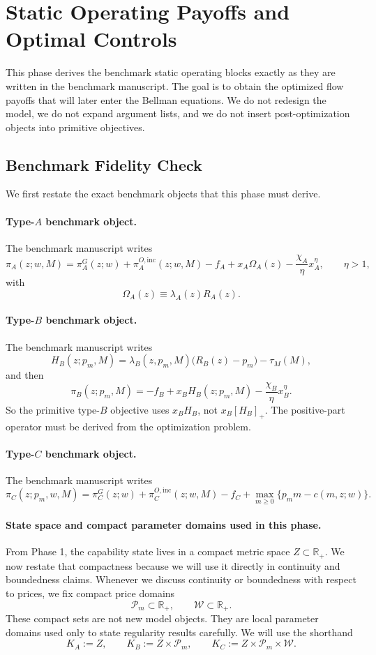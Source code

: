 \section{Static Operating Payoffs and Optimal Controls}

This phase derives the benchmark static operating blocks exactly as they are written in the benchmark manuscript. The goal is to obtain the optimized flow payoffs that will later enter the Bellman equations. We do not redesign the model, we do not expand argument lists, and we do not insert post-optimization objects into primitive objectives.

\subsection{Benchmark Fidelity Check}

We first restate the exact benchmark objects that this phase must derive.

\paragraph{Type-$A$ benchmark object.}
The benchmark manuscript writes
\[
\pi_A(z;w,M)
=
\pi_A^G(z;w)+\pi_A^{O,\mathrm{inc}}(z;w,M)-f_A
+x_A\Omega_A(z)-\frac{\chi_A}{\eta}x_A^\eta,
\qquad \eta>1,
\]
with
\[
\Omega_A(z)\equiv \lambda_A(z)R_A(z).
\]

\paragraph{Type-$B$ benchmark object.}
The benchmark manuscript writes
\[
H_B(z;p_m,M)=\lambda_B(z,p_m,M)\bigl(R_B(z)-p_m\bigr)-\tau_M(M),
\]
and then
\[
\pi_B(z;p_m,M)
=
-f_B+x_BH_B(z;p_m,M)-\frac{\chi_B}{\eta}x_B^\eta.
\]
So the primitive type-$B$ objective uses $x_BH_B$, not $x_B[H_B]_+$. The positive-part operator must be derived from the optimization problem.

\paragraph{Type-$C$ benchmark object.}
The benchmark manuscript writes
\[
\pi_C(z;p_m,w,M)
=
\pi_C^G(z;w)+\pi_C^{O,\mathrm{inc}}(z;w,M)-f_C
+\max_{m\ge 0}\{p_m m-c(m,z;w)\}.
\]

\paragraph{State space and compact parameter domains used in this phase.}
From Phase 1, the capability state lives in a compact metric space $Z\subset \mathbb R_+$. We now restate that compactness because we will use it directly in continuity and boundedness claims. Whenever we discuss continuity or boundedness with respect to prices, we fix compact price domains
\[
\mathcal P_m\subset \mathbb R_+,
\qquad
\mathcal W\subset \mathbb R_+.
\]
These compact sets are not new model objects. They are local parameter domains used only to state regularity results carefully. We will use the shorthand
\[
K_A:=Z,\qquad K_B:=Z\times \mathcal P_m,\qquad K_C:=Z\times \mathcal P_m\times \mathcal W.
\]

